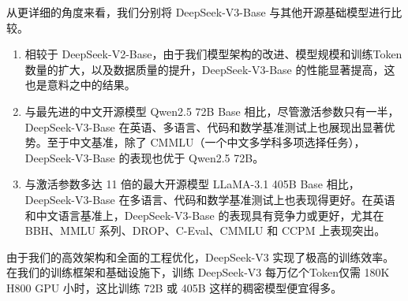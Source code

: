 \documentclass[lang=cn,a4paper,newtx]{elegantpaper}
\newcommand{\dsvii}{DeepSeek-V2}
\newcommand{\dsviii}{DeepSeek-V3}
\begin{document}
从更详细的角度来看，我们分别将 \dsviii{}-Base 与其他开源基础模型进行比较。

\begin{enumerate}
\item 相较于 \dsvii{}-Base，由于我们模型架构的改进、模型规模和训练Token数量的扩大，以及数据质量的提升，\dsviii{}-Base 的性能显著提高，这也是意料之中的结果。
\item 与最先进的中文开源模型 Qwen2.5 72B Base 相比，尽管激活参数只有一半，\dsviii{}-Base 在英语、多语言、代码和数学基准测试上也展现出显著优势。至于中文基准，除了 CMMLU（一个中文多学科多项选择任务），\dsviii{}-Base 的表现也优于 Qwen2.5 72B。
\item 与激活参数多达 11 倍的最大开源模型 LLaMA-3.1 405B Base 相比，\dsviii{}-Base 在多语言、代码和数学基准测试上也表现得更好。在英语和中文语言基准上，\dsviii{}-Base 的表现具有竞争力或更好，尤其在 BBH、MMLU 系列、DROP、C-Eval、CMMLU 和 CCPM 上表现突出。
\end{enumerate}

由于我们的高效架构和全面的工程优化，\dsviii{} 实现了极高的训练效率。在我们的训练框架和基础设施下，训练 \dsviii{} 每万亿个Token仅需 180K H800 GPU 小时，这比训练 72B 或 405B 这样的稠密模型便宜得多。
\end{document}
